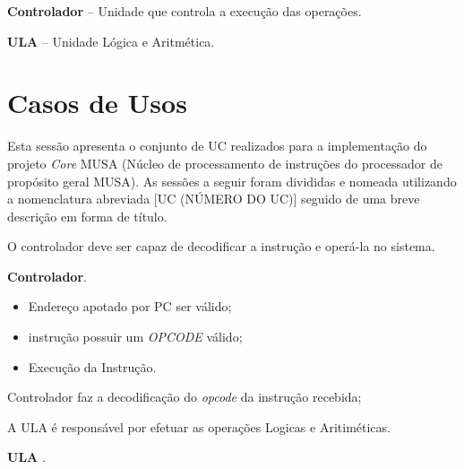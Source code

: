 \documentclass{article}
\begin{document}
\textbf{Controlador} – Unidade que controla a execução das operações.

\textbf{ULA} – Unidade L\'{o}gica e Aritm\'{e}tica.
  
  \section{Casos de Usos}
  Esta sessão apresenta o conjunto de UC realizados para a implementação do projeto \textit{Core }MUSA (Núcleo de processamento de instruções do processador de propósito geral MUSA). As sessões a seguir foram divididas e nomeada utilizando a nomenclatura abreviada [UC (NÚMERO DO UC)] seguido de uma breve descrição em forma de título.

  O controlador deve ser capaz de decodificar a instrução e operá-la no sistema.
  
  \actors
    \begin{description}
     \item \textbf{Controlador}.
    \end{description}
    
  \preconditions 
    \begin{itemize}
     \item Endereço apotado por PC ser válido;
     \item instrução possuir um \textit{OPCODE} válido;
    \end{itemize}

  \postconditions
    \begin{itemize}
     \item Execução da Instrução.
    \end{itemize}

  
  \begin{mainflow}
    \item Controlador faz a decodificação do \textit{opcode} da instrução recebida;
  \end{mainflow}

  A ULA é responsável por efetuar as operações Logicas e Aritiméticas.
  
  \actors
    \begin{description}
     \item \textbf{ULA} .
    \end{description}
    
\end{document}
